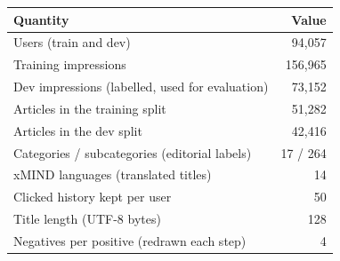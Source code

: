 \begin{tabular}{lr}
\toprule
Quantity & Value\\
\midrule
Users (train and dev) & 94,057\\
Training impressions & 156,965\\
Dev impressions (labelled, used for evaluation) & 73,152\\
Articles in the training split & 51,282\\
Articles in the dev split & 42,416\\
Categories / subcategories (editorial labels) & 17 / 264\\
xMIND languages (translated titles) & 14\\
Clicked history kept per user & 50\\
Title length (UTF-8 bytes) & 128\\
Negatives per positive (redrawn each step) & 4\\
\bottomrule
\end{tabular}
